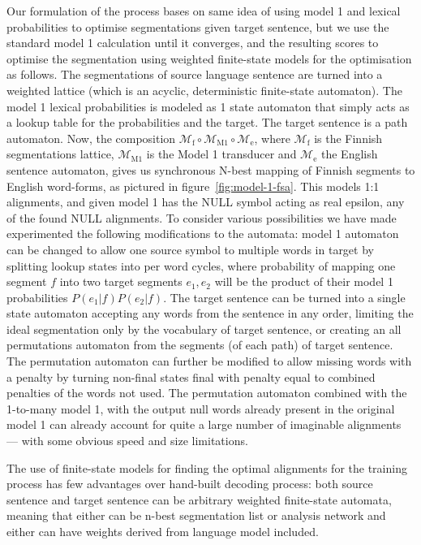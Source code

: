 \documentclass[11pt,letterpaper]{article}
\begin{document}
Our formulation of the process bases on same idea of using model 1 and lexical
probabilities to optimise segmentations given target sentence, but we use the
standard model 1 calculation until it converges, and the resulting scores to optimise the
segmentation using weighted finite-state models for the optimisation as
follows. The segmentations of source language sentence are turned into a
weighted lattice (which is an acyclic, deterministic finite-state automaton).
The model 1 lexical probabilities is modeled as 1 state automaton that simply
acts as a lookup table for the probabilities and the target. The target
sentence is a path automaton. Now, the composition $\mathcal{M}_{\mathrm{f}} \circ
\mathcal{M}_{\mathrm{M1}} \circ \mathcal{M}_{\mathrm{e}}$, where
$\mathcal{M}_{\mathrm{f}}$ is the Finnish segmentations lattice, 
$\mathcal{M}_{\mathrm{M1}}$ is the Model 1 transducer and $\mathcal{M}_{\mathrm{e}}$ the
English sentence automaton, gives us synchronous N-best mapping of Finnish
segments to English word-forms, as pictured in figure~\ref{fig:model-1-fsa}.
This models 1:1 alignments, and given model 1 has
the NULL symbol acting as real epsilon, any of the found NULL alignments. To
consider various possibilities we have made experimented the following
modifications to the automata: model 1 automaton can be changed to allow
one source symbol to multiple words in target by splitting lookup states into
per word cycles, where probability of mapping one segment $f$ into
two target segments $e_1, e_2$ will be the product of their model 1
probabilities $P(e_1|f) P(e_2|f)$. The target sentence can be turned into a
single state automaton accepting any words from the sentence in any order,
limiting the ideal segmentation only by the vocabulary of target sentence,
or creating an all permutations automaton from the segments (of each path) of
target sentence. The permutation automaton can further be modified to allow
missing words with a penalty by turning non-final states final with penalty
equal to combined penalties of the words not used. The permutation automaton
combined with the 1-to-many model 1, with the output null words already
present in the original model 1 can already account for quite a large number
of imaginable alignments --- with some obvious speed and size limitations.


The use of finite-state models for finding the optimal alignments for the
training process has few advantages over hand-built decoding process: both
source sentence and target sentence can be arbitrary weighted finite-state
automata, meaning that either can be n-best segmentation list or analysis
network and either can have weights derived from language model included.
\end{document}
